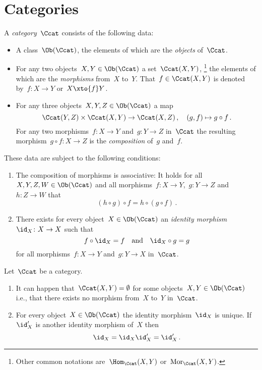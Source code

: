 \section{Categories}

\begin{definition}
  A \emph{category}~$\Ccat$ consists of the following data:
  \begin{itemize}
    \item
      A class~$\Ob(\Ccat)$, the elements of which are the \emph{objects} of~$\Ccat$.
    \item
      For any two objects~$X, Y \in \Ob(\Ccat)$ a set~$\Ccat(X,Y)$,%
      \footnote{Other common notations are~$\Hom_{\Ccat}(X,Y)$ or~$\operatorname{Mor}_{\Ccat}(X,Y)$.}
      the elements of which are the \emph{morphisms} from~$X$ to~$Y$.
      That~$f \in \Ccat(X,Y)$ is denoted by~$f \colon X \to Y$ or~$X \xto{f} Y$.
    \item
      For any three objects~$X, Y, Z \in \Ob(\Ccat)$ a map
      \[
                \Ccat(Y,Z) \times \Ccat(X,Y)
        \to     \Ccat(X,Z) \,,
        \quad   (g, f)
        \mapsto g \circ f \,.
      \]
      For any two morphisms~$f \colon X \to Y$ and~$g \colon Y \to Z$ in~$\Ccat$ the resulting morphism~$g \circ f \colon X \to Z$ is the \emph{composition} of~$g$ and~$f$.
  \end{itemize}
  These data are subject to the following conditions:
  \begin{enumerate}[label=(C\arabic*)]
    \item
      The composition of morphisms is associative:
      It holds for all~$X, Y, Z, W \in \Ob(\Ccat)$ and all morphisms~$f \colon X \to Y$,~$g \colon Y \to Z$ and~$h \colon Z \to W$ that
      \[
          (h \circ g) \circ f
        = h \circ (g \circ f) \,.
      \]
    \item
      There exists for every object~$X \in \Ob(\Ccat)$ an \emph{identity morphism}~$\id_X \colon X \to X$ such that
      \[
        f \circ {\id_X} = f
        \quad\text{and}\quad
        {\id_X} \circ g = g
      \]
      for all morphisms~$f \colon X \to Y$ and~$g \colon Y \to X$ in~$\Ccat$.
  \end{enumerate}
\end{definition}


\begin{remark}
  Let~$\Ccat$ be a category.
  \begin{enumerate}
    \item
      It can happen that~$\Ccat(X,Y) = \emptyset$ for some objects~$X, Y \in \Ob(\Ccat)$ i.e., that there exists no morphism from~$X$ to~$Y$ in~$\Ccat$.
    \item
      For every object~$X \in \Ob(\Ccat)$ the identity morphism~$\id_X$ is unique.
      If~$\id'_X$ is another identity morphism of~$X$ then
      \[
          \id_X
        = \id_X \id'_X
        = \id'_X \,.
      \]
  \end{enumerate}
\end{remark}


